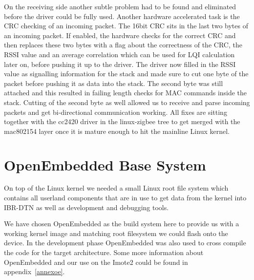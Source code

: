 On the receiving side another subtle problem had to be found and eliminated
before the driver could be fully used. Another hardware accelerated task is the
CRC checking of an incoming packet. The 16bit CRC sits in the last two bytes of
an incoming packet. If enabled, the hardware checks for the correct CRC and
then replaces these two bytes with a flag about the correctness of the CRC, the
RSSI value and an average correlation which can be used for LQI calculation
later on, before pushing it up to the driver. The driver now filled in the RSSI
value as signalling information for the stack and made sure to cut one byte
of the packet before pushing it as data into the stack. The second byte was
still attached and this resulted in failing length checks for MAC commands
inside the stack. Cutting of the second byte as well allowed us to receive
and parse incoming packets and get bi-directional communication working. All
fixes are sitting together with the cc2420 driver in the linux-zigbee tree to
get merged with the mac802154 layer once it is mature enough to hit the
mainline Linux kernel.

\section{OpenEmbedded Base System}
On top of the Linux kernel we needed a small Linux root file system which
contains all userland components that are in use to get data from the kernel
into IBR-DTN as well as development and debugging tools.

We have chosen OpenEmbedded as the build system here to provide us with a working
kernel image and matching root filesystem we could flash onto the device. In the
development phase OpenEmbedded was also used to cross compile the code for the
target architecture. Some more information about OpenEmbedded and our use on the
Imote2 could be found in appendix~\ref{annexoe}.
